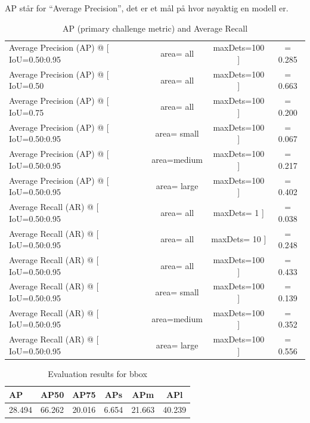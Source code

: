AP står for ``Average Precision'', det er et mål på hvor nøyaktig en modell er.

\begin{table}[]
\bigskip
\centering
\label{tab:ap_retinanet} 
\caption{AP (primary challenge metric) and Average Recall}
\begin{tabular}[t]{lccc}
\toprule
 Average Precision  (AP) @ [ IoU=0.50:0.95 & area=   all & maxDets=100 ] &= 0.285 \\
 Average Precision  (AP) @ [ IoU=0.50      & area=   all & maxDets=100 ] &= 0.663 \\
 Average Precision  (AP) @ [ IoU=0.75      & area=   all & maxDets=100 ] &= 0.200 \\
 Average Precision  (AP) @ [ IoU=0.50:0.95 & area= small & maxDets=100 ] &= 0.067 \\
 Average Precision  (AP) @ [ IoU=0.50:0.95 & area=medium & maxDets=100 ] &= 0.217 \\
 Average Precision  (AP) @ [ IoU=0.50:0.95 & area= large & maxDets=100 ] &= 0.402 \\
\midrule
 Average Recall     (AR) @ [ IoU=0.50:0.95 & area=   all & maxDets=  1 ] &= 0.038 \\
 Average Recall     (AR) @ [ IoU=0.50:0.95 & area=   all & maxDets= 10 ] &= 0.248 \\
 Average Recall     (AR) @ [ IoU=0.50:0.95 & area=   all & maxDets=100 ] &= 0.433 \\
 Average Recall     (AR) @ [ IoU=0.50:0.95 & area= small & maxDets=100 ] &= 0.139 \\
 Average Recall     (AR) @ [ IoU=0.50:0.95 & area=medium & maxDets=100 ] &= 0.352 \\
 Average Recall     (AR) @ [ IoU=0.50:0.95 & area= large & maxDets=100 ] &= 0.556 \\
 \bottomrule	
 \end{tabular}
\end{table}

\begin{table}[]
\bigskip
\centering
\caption{Evaluation results for bbox} 
\label{tab:bbox_retinanet} 
\begin{tabular}[t]{lccccc}
\toprule
   AP   &  AP50  &  AP75  &  APs  &  APm   &  APl    \\
 \midrule
 28.494 & 66.262 & 20.016 & 6.654 & 21.663 & 40.239 \\
 \bottomrule	
 \end{tabular}
\end{table}

